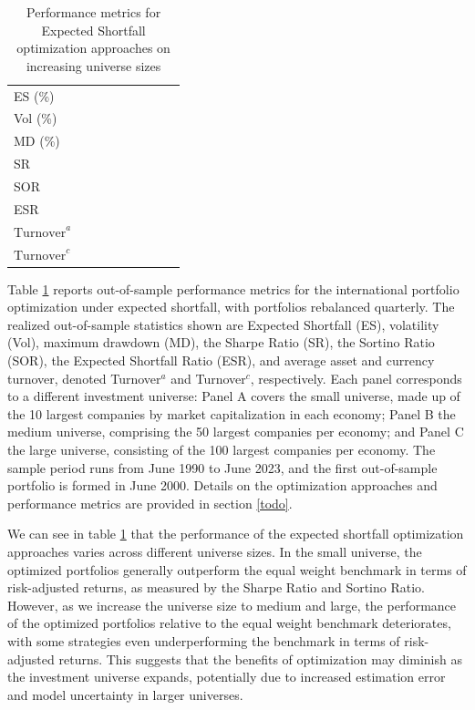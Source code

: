 \begin{table}
{\begin{tabular}{lcccccccc}
    \midrule
    ES (\%) & & \\
    Vol (\%) & & \\
    MD (\%)  & & \\
    SR   & & \\
    SOR  & & \\
    ESR  & & \\
    $\text{Turnover}^a$  & & \\
    $\text{Turnover}^c$  & & \\
    \bottomrule
  \end{tabular}%
}
  \caption{Performance metrics for Expected Shortfall optimization approaches on increasing universe sizes}
    \label{tab:es-universe-sizes}
   \vspace{0.5em}
  \begin{minipage}{\textwidth}
  \raggedright\small
    Table \ref{tab:es-universe-sizes} reports out-of-sample performance metrics for the international
  portfolio optimization under expected shortfall, with portfolios rebalanced
  quarterly. The realized out-of-sample statistics shown are Expected Shortfall (ES), volatility (Vol),
  maximum drawdown (MD), the Sharpe Ratio (SR), the Sortino Ratio (SOR), the Expected Shortfall Ratio (ESR), 
  and average asset and currency turnover, denoted Turnover$^a$ and Turnover$^c$, respectively. 
  Each panel corresponds to a different investment universe:
  Panel A covers the small universe, made up of the 10 largest companies by market
  capitalization in each economy; Panel B the medium universe, comprising the 50 largest
  companies per economy; and Panel C the large universe, consisting of the 100 largest
  companies per economy. The sample period runs from June 1990 to June 2023, and the
  first out-of-sample portfolio is formed in June 2000. Details on the optimization approaches and 
    performance metrics are provided in section \ref{todo}.
  \end{minipage}
\end{table}

We can see in table \ref{tab:es-universe-sizes} that the performance of the expected shortfall optimization approaches varies across 
different universe sizes. In the small universe, the optimized portfolios generally outperform the equal weight benchmark in terms of 
risk-adjusted returns, as measured by the Sharpe Ratio and Sortino Ratio. However, as we increase the universe size to medium and large, 
the performance of the optimized portfolios relative to the equal weight benchmark deteriorates, with some strategies even underperforming 
the benchmark in terms of risk-adjusted returns. This suggests that the benefits of optimization may diminish as the investment universe expands, 
potentially due to increased estimation error and model uncertainty in larger universes. 

